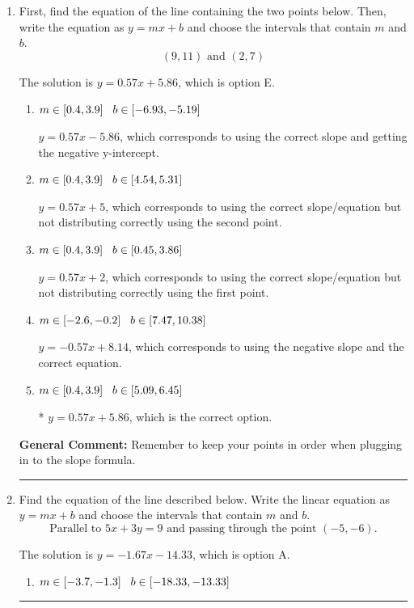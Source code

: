\documentclass{extbook}[14pt]
\newcommand{\litem}[1]{\item #1

\rule{\textwidth}{0.4pt}}
\begin{document}
\begin{enumerate}\litem{
First, find the equation of the line containing the two points below. Then, write the equation as $ y=mx+b $ and choose the intervals that contain $m$ and $b$.
\[ (9, 11) \text{ and } (2, 7) \]

The solution is \( y = 0.57x + 5.86 \), which is option E.\begin{enumerate}[label=\Alph*.]
\item \( m \in [0.4, 3.9] \hspace*{3mm} b \in [-6.93, -5.19] \)

 $y = 0.57x -5.86$, which corresponds to using the correct slope and getting the negative y-intercept.
\item \( m \in [0.4, 3.9] \hspace*{3mm} b \in [4.54, 5.31] \)

 $y = 0.57x + 5$, which corresponds to using the correct slope/equation but not distributing correctly using the second point.
\item \( m \in [0.4, 3.9] \hspace*{3mm} b \in [0.45, 3.86] \)

 $y = 0.57x + 2$, which corresponds to using the correct slope/equation but not distributing correctly using the first point.
\item \( m \in [-2.6, -0.2] \hspace*{3mm} b \in [7.47, 10.38] \)

 $y = -0.57x + 8.14$, which corresponds to using the negative slope and the correct equation.
\item \( m \in [0.4, 3.9] \hspace*{3mm} b \in [5.09, 6.45] \)

* $y = 0.57x + 5.86$, which is the correct option.
\end{enumerate}

\textbf{General Comment:} Remember to keep your points in order when plugging in to the slope formula.
}
\litem{
Find the equation of the line described below. Write the linear equation as $ y=mx+b $ and choose the intervals that contain $m$ and $b$.
\[ \text{Parallel to } 5 x + 3 y = 9 \text{ and passing through the point } (-5, -6). \]

The solution is \( y = -1.67x - 14.33 \), which is option A.\begin{enumerate}[label=\Alph*.]
\item \( m \in [-3.7, -1.3] \hspace*{3mm} b \in [-18.33, -13.33] \)


\end{enumerate}}
\end{enumerate}
\end{document}
